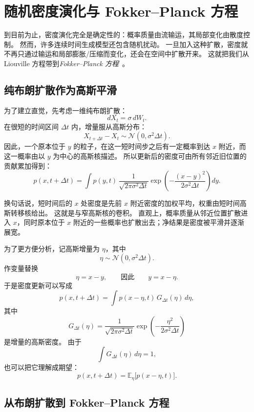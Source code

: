 

\section{随机密度演化与 Fokker--Planck 方程}

到目前为止，密度演化完全是确定性的：概率质量由流输运，其局部变化由散度控制。
然而，许多连续时间生成模型还包含随机扰动。
一旦加入这种扩散，密度就不再只通过输运和局部膨胀/压缩而变化，还会在空间中扩散开来。
这就把我们从 Liouville 方程带到\emph{Fokker--Planck 方程}~\cite{risken1996fokker}。

\subsection{纯布朗扩散作为高斯平滑}

为了建立直觉，先考虑一维纯布朗扩散：
\[
dX_t=\sigma\,dW_t.
\]
在很短的时间区间 $\Delta t$ 内，增量服从高斯分布：
\[
X_{t+\Delta t}-X_t \sim \mathcal{N}(0,\sigma^2\Delta t).
\]
因此，一个原本位于 $y$ 的粒子，在这一短时间步之后有一定概率到达 $x$ 附近，而这一概率由以 $y$ 为中心的高斯核描述。
所以更新后的密度可由所有邻近旧位置的贡献累加得到：
\[
p(x,t+\Delta t)
=
\int p(y,t)\,
\frac{1}{\sqrt{2\pi \sigma^2\Delta t}}
\exp\!\left(
-\frac{(x-y)^2}{2\sigma^2\Delta t}
\right)dy.
\]

换句话说，短时间后的 $x$ 处密度是先前 $x$ 附近密度的加权平均，权重由短时间高斯转移核给出。
这就是与窄高斯核的卷积。
直观上，概率质量从邻近位置扩散进入 $x$，同时原本位于 $x$ 附近的一些概率也扩散出去；净结果是密度被平滑并逐渐展宽。

为了更方便分析，记高斯增量为 $\eta$，其中
\[
\eta\sim \mathcal{N}(0,\sigma^2\Delta t).
\]
作变量替换
\[
\eta=x-y,
\qquad\text{因此}\qquad
y=x-\eta.
\]
于是密度更新可以写成
\[
p(x,t+\Delta t)
=
\int p(x-\eta,t)\,G_{\Delta t}(\eta)\,d\eta,
\]
其中
\[
G_{\Delta t}(\eta)
=
\frac{1}{\sqrt{2\pi \sigma^2\Delta t}}
\exp\!\left(
-\frac{\eta^2}{2\sigma^2\Delta t}
\right)
\]
是增量的高斯密度。
由于
\[
\int G_{\Delta t}(\eta)\,d\eta=1,
\]
也可以把它理解成期望：
\[
p(x,t+\Delta t)=\mathbb{E}_{\eta}\bigl[p(x-\eta,t)\bigr].
\]

\subsection{从布朗扩散到 Fokker--Planck 方程}

